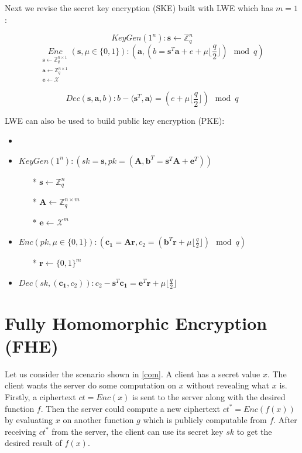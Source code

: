 \documentclass[usletter]{article}
\begin{document}
Next we revise the secret key encryption (SKE) built with LWE which has $m=1$:

$$KeyGen(1^n): \pmb{s}\leftarrow\mathbb{Z}_q^n$$
$$\underset{\substack{
\pmb{s}\leftarrow \mathbb{Z}_q^{n\times1}\\
\pmb{a}\leftarrow\mathbb{Z}_q^{n\times 1}\\
\pmb{e}\leftarrow \mathcal{X}}}{Enc}(\pmb{s},\mu\in\{0,1\}): (\pmb{a}, (b = \pmb{s}^T\pmb{a}+e+\mu\lfloor\frac{q}{2}\rfloor)\mod q)$$


$$Dec(\pmb{s},\pmb{a},b): b-\langle\pmb{s}^T,\pmb{a}\rangle=(e+\mu\lfloor\frac{q}{2}\rfloor) \mod q$$

LWE can also be used to build public key encryption (PKE):
\begin{itemize}
\item \item $KeyGen(1^n): (sk=\pmb{s},pk=(\pmb{A}, \pmb{b}^T=\pmb{s}^T\pmb{A}+\pmb{e}^T))$
\begin{itemize}
\item[*]  $\pmb{s}\leftarrow\mathbb{Z}_q^n$
\item[*] $\pmb{A}\leftarrow\mathbb{Z}_q^{n\times m}$
\item[*] $\pmb{e}\leftarrow\mathcal{X}^m$
\end{itemize}

\item $Enc(pk,\mu\in\{0,1\}): (\pmb{c_1}=\pmb{A}\pmb{r}, c_2=(\pmb{b}^T\pmb{r}+\mu\lfloor\frac{q}{2}\rfloor)\mod q)$
\begin{itemize}
\item[*]  $\pmb{r}\longleftarrow\{0,1\}^m$
\end{itemize}

\item $Dec(sk,(\pmb{c_1},c_2)): c_2-\pmb{s}^T\pmb{c_1}=\pmb{e}^T\pmb{r}+\mu\lfloor\frac{q}{2}\rfloor$
\end{itemize}


\section{Fully Homomorphic Encryption (FHE)}

Let us consider the scenario shown in \ref{com}. A client has a secret value $x$. The client wants the server do some computation on $x$ without revealing what $x$ is. Firstly, a ciphertext $ct=Enc(x)$ is sent to the server along with the desired function $f$. Then the server could compute a new ciphertext $ct^*=Enc(f(x))$ by evaluating $x$ on another function $g$ which is publicly computable from $f$. After receiving $ct^*$ from the server, the client can use its secret key $sk$ to get the desired result of $f(x)$.
\end{document}
